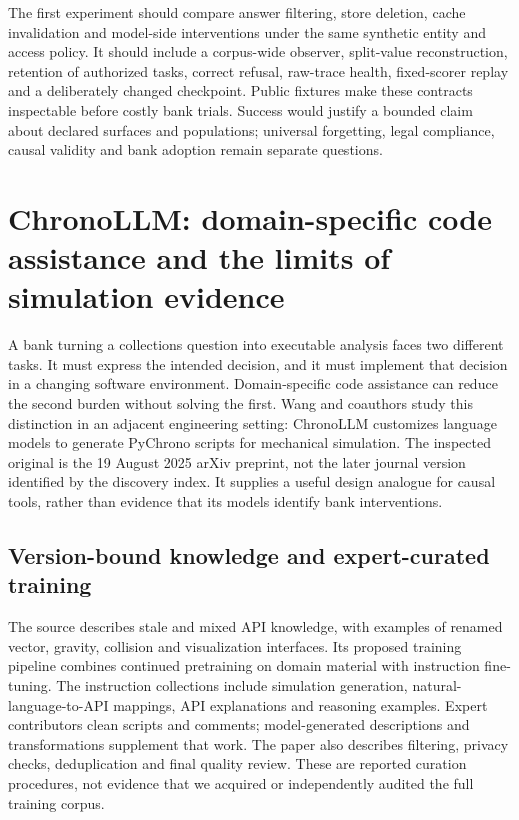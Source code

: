 The first experiment should compare answer filtering, store deletion, cache
invalidation and model-side interventions under the same synthetic entity and
access policy. It should include a corpus-wide observer, split-value
reconstruction, retention of authorized tasks, correct refusal, raw-trace health,
fixed-scorer replay and a deliberately changed checkpoint. Public fixtures make
these contracts inspectable before costly bank trials. Success would justify
a bounded claim about declared surfaces and populations; universal forgetting,
legal compliance, causal validity and bank adoption remain separate questions.



\section{ChronoLLM: domain-specific code assistance and the limits of simulation evidence}
\label{sec:exec24-chronollm}
A bank turning a collections question into executable analysis faces two
different tasks. It must express the intended decision, and it must implement
that decision in a changing software environment. Domain-specific code
assistance can reduce the second burden without solving the first. Wang and
coauthors study this distinction in an adjacent engineering setting:
ChronoLLM customizes language models to generate PyChrono scripts for
mechanical simulation. The inspected original is the 19 August 2025 arXiv
preprint, not the later journal version identified by the discovery index.
It supplies a useful design analogue for causal tools, rather than evidence
that its models identify bank interventions.~\citep{exec24_chronollm_original}

\subsection{Version-bound knowledge and expert-curated training}
The source describes stale and mixed API knowledge, with examples of renamed
vector, gravity, collision and visualization interfaces. Its proposed training
pipeline combines continued pretraining on domain material with instruction
fine-tuning. The instruction collections include simulation generation,
natural-language-to-API mappings, API explanations and reasoning examples.
Expert contributors clean scripts and comments; model-generated descriptions
and transformations supplement that work. The paper also describes filtering,
privacy checks, deduplication and final quality review. These are reported
curation procedures, not evidence that we acquired or independently audited
the full training corpus.~\citep{exec24_chronollm_original}

